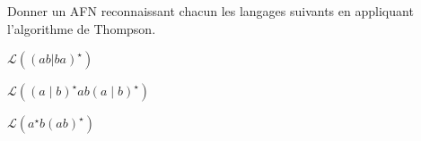 
\begingroup

\begin{exercice}\label{exo:lexing/kleene/thompson}

  Donner un AFN reconnaissant chacun les langages suivants en appliquant l'algorithme de Thompson.
  \begin{questions}
  \item $\mathcal{L}((ab|ba)^\star)$
  \item $\mathcal{L}((a \mid b)^\star ab (a \mid b)^\star)$
  \item $\mathcal{L}(a^\star b (ab)^\star)$
  \end{questions}

\end{exercice}

